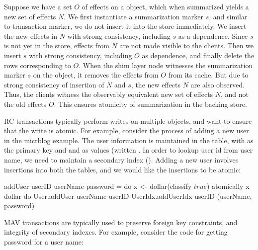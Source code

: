 
Suppose we have a set $O$ of effects on a object, which when summarized yields
a new set of effects $N$. We first instantiate a summarization marker $s$, and
similar to transaction marker, we do not insert it into the store immediately.
We insert the new effects in $N$ with strong consistency, including $s$ as a
dependence. Since $s$ is not yet in the store, effects from $N$ are not made
visible to the clients. Then we insert $s$ with strong consistency, including
$O$ as dependence, and finally delete the rows corresponding to $O$. When the
shim layer node witnesses the summarization marker $s$ on the object, it
removes the effects from $O$ from its cache. But due to strong consistency of
insertion of $N$ and $s$, the new effects $N$ are also observed. Thus, the
clients witness the observably equivalent new set of effects $N$, and not the
old effects $O$. This ensures atomicity of summarization in the backing store.


RC transactions typically perform writes on multiple objects, and want to
ensure that the write is atomic. For example, consider the process of adding a
new user in the micrblog example. The user information is maintained in the
 table, with  as the primary key and  and
 as values (written . In
order to lookup user id from user name, we need to maintain a secondary index
(). Adding a new user involves insertions
into both the tables, and we would like the insertions to be atomic:

\begin{codehaskell}
addUser userID userName password = do
	x <- dollar(classify $true$)
	atomically x dollar do
	  User.addUser userName userID
		UserIdx.addUserIdx userID (userName, password)
\end{codehaskell}

MAV transactions are typically used to preserve foreign key constraints, and
integrity of secondary indexes. For example, consider the code for getting
password for a user name:

